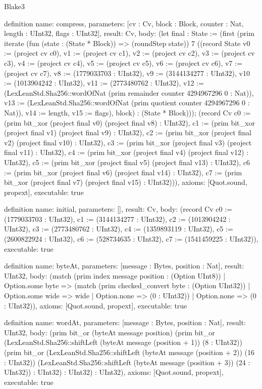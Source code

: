 \begin{lexlean}{Blake3}
\begin{semanticmodule}
definition{
  name: compress,
  parameters: [cv : Cv, block : Block, counter : Nat, length : UInt32, flags : UInt32],
  result: Cv,
  body: (let final : State := (first (prim iterate (fun (state : (State * Block)) => (roundStep state)) 7 ((record State {v0 := (project cv c0), v1 := (project cv c1), v2 := (project cv c2), v3 := (project cv c3), v4 := (project cv c4), v5 := (project cv c5), v6 := (project cv c6), v7 := (project cv c7), v8 := (1779033703 : UInt32), v9 := (3144134277 : UInt32), v10 := (1013904242 : UInt32), v11 := (2773480762 : UInt32), v12 := (LexLeanStd.Sha256::wordOfNat (prim remainder counter 4294967296 0 : Nat)), v13 := (LexLeanStd.Sha256::wordOfNat (prim quotient counter 4294967296 0 : Nat)), v14 := length, v15 := flags}), block) : (State * Block))); (record Cv {c0 := (prim bit_xor (project final v0) (project final v8) : UInt32), c1 := (prim bit_xor (project final v1) (project final v9) : UInt32), c2 := (prim bit_xor (project final v2) (project final v10) : UInt32), c3 := (prim bit_xor (project final v3) (project final v11) : UInt32), c4 := (prim bit_xor (project final v4) (project final v12) : UInt32), c5 := (prim bit_xor (project final v5) (project final v13) : UInt32), c6 := (prim bit_xor (project final v6) (project final v14) : UInt32), c7 := (prim bit_xor (project final v7) (project final v15) : UInt32)})),
  axioms: [Quot.sound, propext],
  executable: true
}

definition{
  name: initial,
  parameters: [],
  result: Cv,
  body: (record Cv {c0 := (1779033703 : UInt32), c1 := (3144134277 : UInt32), c2 := (1013904242 : UInt32), c3 := (2773480762 : UInt32), c4 := (1359893119 : UInt32), c5 := (2600822924 : UInt32), c6 := (528734635 : UInt32), c7 := (1541459225 : UInt32)}),
  executable: true
}

definition{
  name: byteAt,
  parameters: [message : Bytes, position : Nat],
  result: UInt32,
  body: (match (prim index message position : (Option UInt8))
    | Option.some byte => (match (prim checked_convert byte : (Option UInt32))
      | Option.some wide => wide
      | Option.none => (0 : UInt32))
    | Option.none => (0 : UInt32)),
  axioms: [Quot.sound, propext],
  executable: true
}

definition{
  name: wordAt,
  parameters: [message : Bytes, position : Nat],
  result: UInt32,
  body: (prim bit_or (byteAt message position) (prim bit_or (LexLeanStd.Sha256::shiftLeft (byteAt message (position + 1)) (8 : UInt32)) (prim bit_or (LexLeanStd.Sha256::shiftLeft (byteAt message (position + 2)) (16 : UInt32)) (LexLeanStd.Sha256::shiftLeft (byteAt message (position + 3)) (24 : UInt32)) : UInt32) : UInt32) : UInt32),
  axioms: [Quot.sound, propext],
  executable: true
}


\end{semanticmodule}
\end{lexlean}
